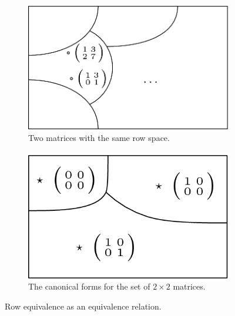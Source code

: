 \documentclass{article}
\begin{document}
        \begin{figure}[H]
            \centering
            \begin{subfigure}{0.45\textwidth}
                \centering
                \includegraphics[scale = .22]{sp23/hw-supplements/hw5-supp/images/linalg_reduced_echelon_form_equiv_classes.png}
                \caption{Two matrices with the same row space.}
            \end{subfigure}
            \begin{subfigure}{0.45\textwidth}
                \centering
                \includegraphics[scale = .33]{sp23/hw-supplements/hw5-supp/images/linalg_2by2_rank_equivalence_classes.png}
                \caption{The canonical forms for the set of $2 \times 2$ matrices.}
            \end{subfigure}
            \caption{Row equivalence as an equivalence relation.}
            \label{fig:2}
        \end{figure}
\end{document}
